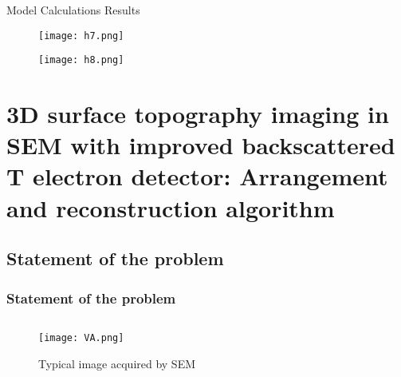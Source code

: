 \documentclass{beamer}
\begin{document}
\begin{frame}[c, allowframebreaks]{Model Calculations Results}

    \begin{figure}[t]
        \texttt{[image: h7.png]}\label{fig:h7}
    \end{figure}

    \framebreak

    \begin{figure}
        \texttt{[image: h8.png]}\label{fig:h8}
    \end{figure}
\end{frame}



\section{3D surface topography imaging in SEM with improved backscattered T
electron detector: Arrangement and reconstruction algorithm}
\begin{frame}
    \sectionpage
\end{frame}

\subsection{Statement of the problem}
\begin{frame}[c]
    \frametitle{Statement of the problem}
    \begin{columns}
        \begin{column}{0.5\textwidth}
            \begin{figure}
                \texttt{[image: VA.png]}
                \caption{Typical image acquired by SEM}
            \end{figure}
        \end{column}
        \begin{column}{0.5\textwidth}
        \end{column}
    \end{columns}
\end{frame}
\end{document}
